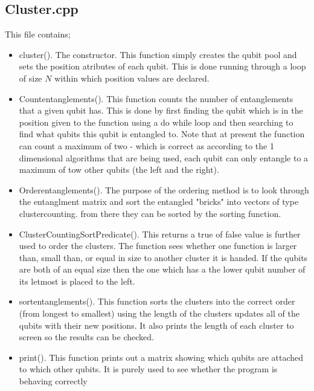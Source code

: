 \documentclass{article}
\numberwithin{equation}{section} %
\begin{document}
\subsection{Cluster.cpp} This file contains;
\begin{itemize}

\item cluster(). The constructor. This function simply creates the qubit pool and sets the position atributes of each qubit. This is done running through a loop of size $N$ within which position values are declared. \\

\item Count\textunderscore entanglements(). This function counts the number of entanglements that a given qubit has. This is done by first finding the qubit which is in the position given to the function using a do while loop and then searching to find what qubits this qubit is entangled to. Note that at present the function can count a maximum of two - which is correct as according to the 1 dimensional algorithms that are being used, each qubit can only entangle to a maximum of tow other qubits (the left and the right). 

\item  Order\textunderscore entanglements(). The purpose of the ordering method is to look through the entanglment matrix and sort the entangled "bricks" into vectors of type clustercounting. from there they can be sorted by the sorting function.

\item ClusterCountingSortPredicate(). This returns a true of false value is further used to order the clusters. The function sees whether one function is larger than, small than, or equal in size to another cluster it is handed. If the qubits are both of an equal size then the one which has a the lower qubit number of its letmost is placed to the left.
 
\item sort\textunderscore entanglements(). This function sorts the clusters into the correct order (from longest to smallest) using the length of the clusters updates all of the qubits with their new positions. It also prints the length of each cluster to screen so the results can be checked. 

\item print(). This function prints out a matrix showing which qubits are attached to which other qubits. It is purely used to see whether the program is behaving correctly


\end{itemize}
\end{document}
